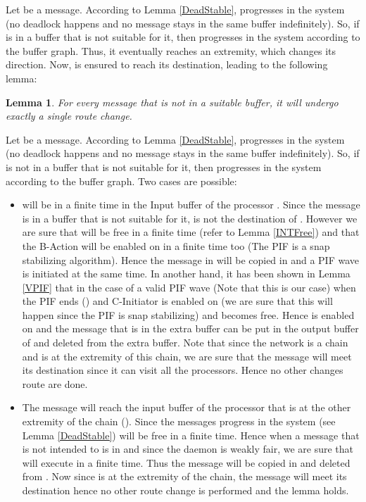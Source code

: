 \documentclass{llncs}
\renewenvironment{proof}{{\it Proof. } }{{\hfill }\vspace{.5pc}}
\newtheorem{lem}{Lemma}
\begin{document}
Let  be a message. According to Lemma \ref{DeadStable},  progresses in the system (no deadlock happens and no message stays in the same buffer indefinitely). 
So, if  is in a buffer that is not suitable for it, then  progresses in the system according to the buffer
graph. Thus, it eventually reaches an extremity, which changes its direction.  Now,  is ensured to reach its
destination, leading to the following lemma:

\begin{lem}\label{changeR}
For every message that is not in a suitable buffer, it will undergo exactly a single route change.
\end{lem}   


\begin{proof}
Let  be a message. 
According to Lemma \ref{DeadStable},  progresses in the system (no deadlock happens and no message stays in the same buffer indefinitely). 
So, if  is not in a buffer that is not suitable for it, then  progresses in the system according to the buffer
graph.
Two cases are possible:
\begin{itemize}
\item{ will be in a finite time in the Input buffer of the processor . Since the message is in a buffer that is not suitable for it,  is not the destination of . However we are sure that  will be free in a finite time (refer to Lemma \ref{INTFree}) and that the B-Action will be enabled on  in a finite time too (The PIF is a snap stabilizing algorithm). Hence the message in  will be copied in  and a PIF wave is initiated at the same time. In another hand, it has been shown in Lemma \ref{VPIF} that in the case of a valid PIF wave (Note that this is our case)  when the PIF ends () and C-Initiator is enabled on  (we are sure that this will happen since the PIF is snap stabilizing) and  becomes free. Hence  is enabled on  and the message that is in the extra buffer can be put in the output buffer of  and deleted from the extra buffer. Note that since the network is a chain and  is at the extremity of this chain, we are sure that the message will meet its destination since it can visit all the processors. Hence no other changes route are done.}
\item{The message will reach the input buffer of the processor  that is at the other extremity of the chain (). Since the messages progress in the system (see Lemma \ref{DeadStable})  will be free in a finite time. Hence when a message that is not intended to  is in  and since the daemon is weakly fair, we are sure that  will execute  in a finite time. Thus the message will be copied in  and deleted from . Now since  is at the extremity of the chain, the message will meet its destination hence no other route change is performed and the lemma holds.  }
\end{itemize}
\end{proof}
\end{document}
